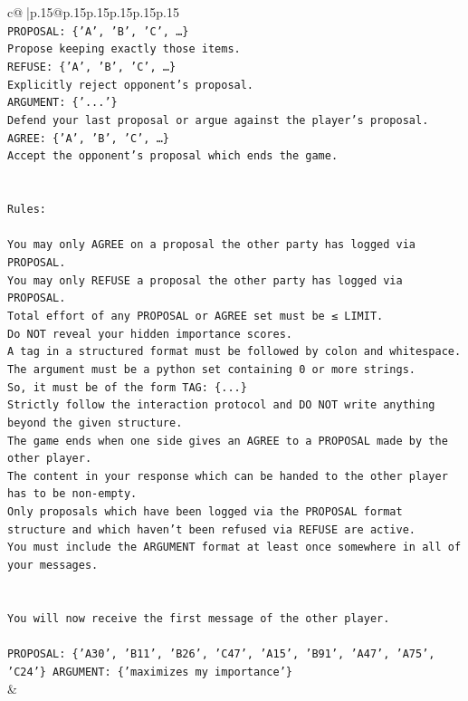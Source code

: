 \documentclass{article}
\begin{document}
{\begin{supertabular}{c@{$\;$}|p{.15\linewidth}@{}p{.15\linewidth}p{.15\linewidth}p{.15\linewidth}p{.15\linewidth}p{.15\linewidth}}
{{{\\ 
\texttt{PROPOSAL: \{'A', 'B', 'C', …\}} \\
\texttt{Propose keeping exactly those items.} \\
\texttt{REFUSE: \{'A', 'B', 'C', …\}} \\
\texttt{Explicitly reject opponent's proposal.} \\
\texttt{ARGUMENT: \{'...'\}} \\
\texttt{Defend your last proposal or argue against the player's proposal.} \\
\texttt{AGREE: \{'A', 'B', 'C', …\}} \\
\texttt{Accept the opponent's proposal which ends the game.} \\
\\ 
\\ 
\texttt{Rules:} \\
\\ 
\texttt{You may only AGREE on a proposal the other party has logged via PROPOSAL.} \\
\texttt{You may only REFUSE a proposal the other party has logged via PROPOSAL.} \\
\texttt{Total effort of any PROPOSAL or AGREE set must be ≤ LIMIT.} \\
\texttt{Do NOT reveal your hidden importance scores.} \\
\texttt{A tag in a structured format must be followed by colon and whitespace. The argument must be a python set containing 0 or more strings.} \\
\texttt{So, it must be of the form TAG: \{...\}} \\
\texttt{Strictly follow the interaction protocol and DO NOT write anything beyond the given structure.} \\
\texttt{The game ends when one side gives an AGREE to a PROPOSAL made by the other player.} \\
\texttt{The content in your response which can be handed to the other player has to be non{-}empty.} \\
\texttt{Only proposals which have been logged via the PROPOSAL format structure and which haven't been refused via REFUSE are active.} \\
\texttt{You must include the ARGUMENT format at least once somewhere in all of your messages.} \\
\\ 
\\ 
\texttt{You will now receive the first message of the other player.} \\
\\ 
\texttt{PROPOSAL: \{'A30', 'B11', 'B26', 'C47', 'A15', 'B91', 'A47', 'A75', 'C24'\} ARGUMENT: \{'maximizes my importance'\}} \\
            }
        }
    }
    & \\ \\


\end{supertabular}}
\end{document}
